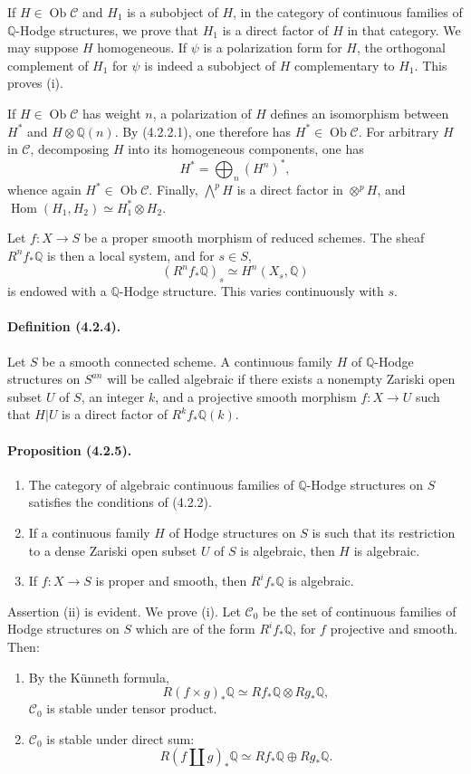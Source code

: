 \documentclass[10pt]{article}
\newcommand{\Q}{\mathbb Q}
\newcommand{\Hom}{\operatorname{Hom}}
\newcommand{\Ob}{\operatorname{Ob}}
\begin{document}
If $H\in\Ob\mathcal C$ and $H_1$ is a subobject of $H$, in the category of continuous families of $\Q$-Hodge structures, we prove that $H_1$ is a direct factor of $H$ in that category. We may suppose $H$ homogeneous. If $\psi$ is a polarization form for $H$, the orthogonal complement of $H_1$ for $\psi$ is indeed a subobject of $H$ complementary to $H_1$. This proves (i).

If $H\in\Ob\mathcal C$ has weight $n$, a polarization of $H$ defines an isomorphism between $H^*$ and $H\otimes\Q(n)$. By (4.2.2.1), one therefore has $H^*\in\Ob\mathcal C$. For arbitrary $H$ in $\mathcal C$, decomposing $H$ into its homogeneous components, one has
\[
H^*=\bigoplus_n (H^n)^*,
\]
whence again $H^*\in\Ob\mathcal C$. Finally, $\bigwedge^pH$ is a direct factor in $\otimes^pH$, and $\Hom(H_1,H_2)\simeq H_1^*\otimes H_2$.

Let $f:X\to S$ be a proper smooth morphism of reduced schemes. The sheaf $R^nf_*\Q$ is then a local system, and for $s\in S$,
\[
(R^nf_*\Q)_s\simeq H^n(X_s,\Q)
\]
is endowed with a $\Q$-Hodge structure. This varies continuously with $s$.

\paragraph{Definition (4.2.4).} Let $S$ be a smooth connected scheme. A continuous family $H$ of $\Q$-Hodge structures on $S^{an}$ will be called algebraic if there exists a nonempty Zariski open subset $U$ of $S$, an integer $k$, and a projective smooth morphism $f:X\to U$ such that $H|U$ is a direct factor of $R^kf_*\Q(k)$.

\paragraph{Proposition (4.2.5).}
\begin{enumerate}[label=(\roman*)]
\item The category of algebraic continuous families of $\Q$-Hodge structures on $S$ satisfies the conditions of (4.2.2).
\item If a continuous family $H$ of Hodge structures on $S$ is such that its restriction to a dense Zariski open subset $U$ of $S$ is algebraic, then $H$ is algebraic.
\item If $f:X\to S$ is proper and smooth, then $R^if_*\Q$ is algebraic.
\end{enumerate}

Assertion (ii) is evident. We prove (i). Let $\mathcal C_0$ be the set of continuous families of Hodge structures on $S$ which are of the form $R^if_*\Q$, for $f$ projective and smooth. Then:
\begin{enumerate}[label=\alph*)]
\item By the Künneth formula,
\[
R(f\times g)_*\Q\simeq Rf_*\Q\otimes Rg_*\Q,
\]
$\mathcal C_0$ is stable under tensor product.
\item $\mathcal C_0$ is stable under direct sum:
\[
R(f\amalg g)_*\Q\simeq Rf_*\Q\oplus Rg_*\Q.
\]
\end{enumerate}
\end{document}
